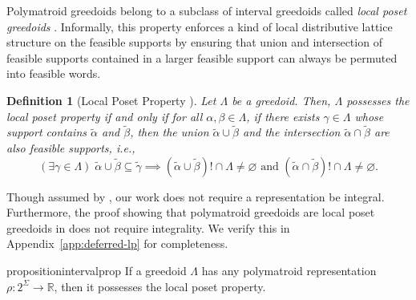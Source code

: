 \documentclass[11pt]{article}
\newtheorem{definition}[theorem]{Definition}
\newcommand{\univ}{\Sigma}
\newcommand{\glang}{\Lambda}
\begin{document}
Polymatroid greedoids belong to a subclass of interval greedoids called \emph{local poset greedoids} \cite{korte1985polymatroid}.
Informally, this property enforces a kind of local distributive lattice structure on the feasible supports by ensuring that union and intersection of feasible supports contained in a larger feasible support can always be permuted into feasible words.

\begin{definition}[Local Poset Property \cite{korte1985polymatroid}]\label{def:local-poset}
    Let $\glang$ be a greedoid. Then, $\glang$ possesses the \emph{local poset property} if and only if for all $\alpha,\beta\in\glang$, if there exists $\gamma\in\glang$ whose support contains $\widetilde{\alpha}$ and $\widetilde{\beta}$, then the union $\widetilde{\alpha}\cup\widetilde{\beta}$ and the intersection $\widetilde{\alpha}\cap\widetilde{\beta}$ are also feasible supports, i.e., 
\begin{equation}\label{eq:local-poset}
    \left(\exists \gamma \in \glang\right)\; \widetilde{\alpha}\cup \widetilde{\beta} \subseteq \widetilde{\gamma} \implies \left(\widetilde{\alpha}\cup \widetilde{\beta}\right)! \cap \glang \neq \varnothing\text{ and }\left(\widetilde{\alpha}\cap \widetilde{\beta}\right)!\cap \glang \neq \varnothing.
\end{equation}
\end{definition}

Though assumed by \cite{korte1985polymatroid}, our work does not require a representation be integral.
Furthermore, the proof showing that polymatroid greedoids are local poset greedoids in \cite{korte1985polymatroid} does not require integrality.
We verify this in Appendix~\ref{app:deferred-lp} for completeness.
\begin{restatable}{proposition}{intervalprop}\label{prop:representation->local-poset} 
    If a greedoid $\glang$ has any polymatroid representation $\rho:2^\univ\to\mathbb{R}$, then it possesses the local poset property.
\end{restatable}
\end{document}
